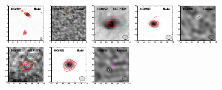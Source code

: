 \documentclass[iop]{emulateapj}
\begin{document}
\begin{figure}[!tbp]
\begin{centering}
\includegraphics[width=0.162\textwidth]{../Figures/modelfit/HXMM11_model_bestfit.pdf}
\includegraphics[width=0.162\textwidth]{../Figures/modelfit/HXMM11_residual_bestfit.pdf}
\includegraphics[width=0.162\textwidth]{../Figures/modelfit/HXMM23_optical_bestfit.pdf}
\includegraphics[width=0.162\textwidth]{../Figures/modelfit/HXMM23_model_bestfit.pdf}
\includegraphics[width=0.162\textwidth]{../Figures/modelfit/HXMM23_residual_bestfit.pdf}
\includegraphics[width=0.162\textwidth]{../Figures/modelfit/HXMM22_optical_bestfit.pdf}
\includegraphics[width=0.162\textwidth]{../Figures/modelfit/HXMM22_model_bestfit.pdf}
\includegraphics[width=0.162\textwidth]{../Figures/modelfit/HXMM22_residual_bestfit.pdf}

\end{centering}
\end{figure}
\end{document}
